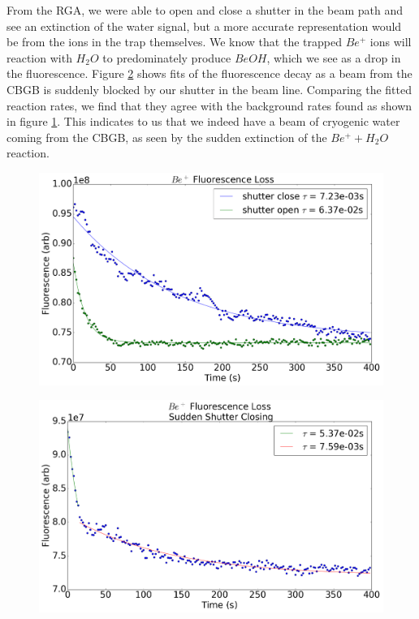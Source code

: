 From the RGA, we were able to open and close a shutter in the beam path and see an extinction of the water signal, but a more accurate representation would be from the ions in the trap themselves. We know that the trapped $Be^+$ ions will reaction with $H_2O$ to predominately produce $BeOH$, which we see as a drop in the fluorescence. Figure \ref{f: shutter_closing} shows fits of the fluorescence decay as a beam from the CBGB is suddenly blocked by our shutter in the beam line. Comparing the fitted reaction rates, we find that they agree with the background rates found as shown in figure \ref{f: shutter_bkg}. This indicates to us that we indeed have a beam of cryogenic water coming from the CBGB, as seen by the sudden extinction of the $Be^+ + H_2O$ reaction.

\begin{figure}[H] \label{f: shutter_bkg}
\centering
\includegraphics[width=1\textwidth]{images/CBGB_sudden_shutter_flow_bkg.png}
\caption{}
\end{figure}

\begin{figure}[H] \label{f: shutter_closing}
\centering
\includegraphics[width=1\textwidth]{images/CBGB_sudden_shutter_flow.png}
\caption{}
\end{figure}

